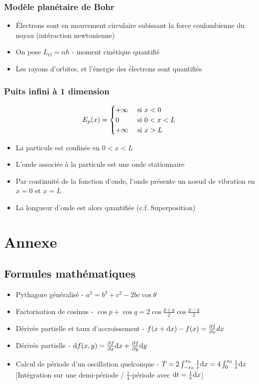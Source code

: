 \documentclass[openany]{book}
\begin{document}
\subsection{Modèle planétaire de Bohr}
\begin{itemize}
    \item Électrons sont en mouvement circulaire subissant la force coulombienne du noyau (intéraction newtonienne)
    \item On pose $L_O = n \hbar$ - moment cinétique quantifié 
    \item Les rayons d'orbites, et l'énergie des électrons sont quantifiés
\end{itemize}

\subsection{Puits infini à 1 dimension}

\[ E_p(x) = \begin{cases}
    +\infty & \text{ si } x < 0 \\
    0 & \text{ si } 0 < x < L \\
    +\infty & \text{ si } x > L
\end{cases} \]

\begin{itemize}
    \item La particule est confinée en $0 < x < L$
    \item L'onde associée à la particule est une onde stationnaire
    \item Par continuité de la fonction d'onde, l'onde présente un noeud de vibration en $x=0$ et $x=L$
    \item La longueur d'onde est alors quantifiée (c.f. Superposition)
\end{itemize}

\clearpage

\chapter{Annexe}
\section{Formules mathématiques}
\begin{itemize}
    \item Pythagore généralisé - $ a^2 = b^2 + c^2 - 2bc\cos{\theta} $
    \item Factorisation de cosinus - $ \cos{p} + \cos{q} = 2 \cos{\frac{p+q}{2}}\cos{\frac{p-q}{2}} $ 
    \item Dérivée partielle et taux d'accroissement - $f(x+\text{d}x) - f(x) = \frac{\partial f}{\partial x} dx$
    \item Dérivée partielle - $\text{d} f(x, y) = \frac{\partial f}{\partial x} \text{d}x + \frac{\partial f}{\partial y} \text{d}y$
    \item Calcul de période d'un oscillation quelconque - $T = 2 \int_{-x_0}^{x_0} \frac{1}{\dot{x}} \text{d}x = 4 \int_{0}^{x_0} \frac{1}{\dot{x}} \text{d}x$ [Intégration sur une demi-période / $\frac{1}{4}$-période avec $\text{d}t = \frac{1}{\dot{x}} \text{d}x$]
\end{itemize}
\end{document}
